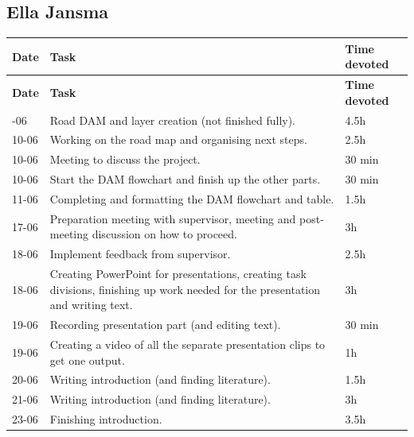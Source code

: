 \subsection*{Ella Jansma}
\begin{longtable}{@{}p{2cm}p{9.5cm}p{2.5cm}@{}}
\toprule
\textbf{Date} & \textbf{Task} & \textbf{Time devoted} \\
\midrule
\endfirsthead
\toprule
\textbf{Date} & \textbf{Task} & \textbf{Time devoted} \\
\midrule
\endhead
\bottomrule
\endfoot
09-06 & Road DAM and layer creation (not finished fully). & 4.5h \\
10-06 & Working on the road map and organising next steps. & 2.5h \\
10-06 & Meeting to discuss the project. & 30 min \\
10-06 & Start the DAM flowchart and finish up the other parts. & 30 min \\
11-06 & Completing and formatting the DAM flowchart and table. & 1.5h \\
17-06 & Preparation meeting with supervisor, meeting and post-meeting discussion on how to proceed. & 3h \\
18-06 & Implement feedback from supervisor. & 2.5h \\
18-06 & Creating PowerPoint for presentations, creating task divisions, finishing up work needed for the presentation and writing text. & 3h \\
19-06 & Recording presentation part (and editing text). & 30 min \\
19-06 & Creating a video of all the separate presentation clips to get one output. & 1h \\
20-06 & Writing introduction (and finding literature). & 1.5h \\
21-06 & Writing introduction (and finding literature). & 3h \\
23-06 & Finishing introduction. & 3.5h \\
\end{longtable}

